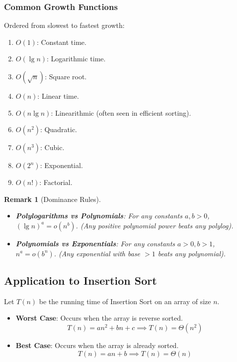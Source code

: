 \documentclass[12pt]{article}
\theoremstyle{blueplain}
\theoremstyle{bluedef}
\theoremstyle{blueremark}
\newtheorem{remark}{Remark}[section]
\begin{document}
\subsubsection{Common Growth Functions}
Ordered from slowest to fastest growth:
\begin{enumerate}
    \item $O(1)$: Constant time.
    \item $O(\lg n)$: Logarithmic time.
    \item $O(\sqrt{n})$: Square root.
    \item $O(n)$: Linear time.
    \item $O(n \lg n)$: Linearithmic (often seen in efficient sorting).
    \item $O(n^2)$: Quadratic.
    \item $O(n^3)$: Cubic.
    \item $O(2^n)$: Exponential.
    \item $O(n!)$: Factorial.
\end{enumerate}

\begin{remark}[Dominance Rules]
    \begin{itemize}
        \item \textbf{Polylogarithms vs Polynomials}: For any constants $a, b > 0$, $(\lg n)^a = o(n^b)$. (Any positive polynomial power beats any polylog).
        \item \textbf{Polynomials vs Exponentials}: For any constants $a > 0, b > 1$, $n^a = o(b^n)$. (Any exponential with base $>1$ beats any polynomial).
    \end{itemize}
\end{remark}

\subsection{Application to Insertion Sort}

Let $T(n)$ be the running time of Insertion Sort on an array of size $n$.

\begin{itemize}
    \item \textbf{Worst Case}: Occurs when the array is reverse sorted.
          \[ T(n) = an^2 + bn + c \implies T(n) = \Theta(n^2) \]
    \item \textbf{Best Case}: Occurs when the array is already sorted.
          \[ T(n) = an + b \implies T(n) = \Theta(n) \]
\end{itemize}
\end{document}
